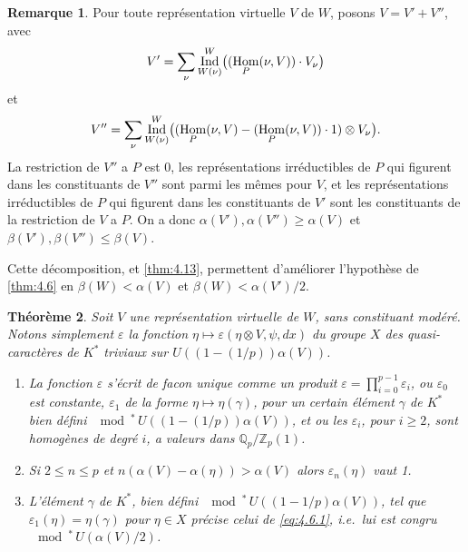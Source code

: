 \documentclass[12pt,a4paper]{article}
\theoremstyle{plain}
\newtheorem{theorem}{Th\'eor\`eme}[section]
\theoremstyle{definition}
\newtheorem{remark}[theorem]{Remarque}
\theoremstyle{remark}
\DeclareMathOperator{\Ind}{Ind}
\DeclareMathOperator{\Hom}{Hom}
\newcommand{\bQ}{\mathbb{Q}}
\newcommand{\bZ}{\mathbb{Z}}
\let\dim\relax\let\det\relax
\providecommand{\Hom}{\operatorname{Hom}}
\begin{document}
\begin{remark}\label{rem:4.14}
Pour toute repr\'esentation virtuelle $V$ de $W$, posons $V = V' + V''$, avec
\[
V' = \sum_\nu \Ind_{W(\nu)}^W\bigl((\dim \Hom_P(\nu, V)) \cdot V_\nu\bigr)
\]
et
\[
V'' = \sum_\nu \Ind_{W(\nu)}^W\bigl((\Hom_P(\nu, V) - (\dim \Hom_P(\nu, V)) \cdot 1) \otimes V_\nu\bigr).
\]
La restriction de $V''$ a $P$ est 0, les repr\'esentations irr\'eductibles de $P$ qui figurent dans les constituants de $V''$ sont parmi les m\^emes pour $V$, et les repr\'esentations irr\'eductibles de $P$ qui figurent dans les constituants de $V'$ sont les constituants de la restriction de $V$ a $P$. On a donc $\alpha(V'), \alpha(V'') \geq \alpha(V)$ et $\beta(V'), \beta(V'') \leq \beta(V)$.

Cette d\'ecomposition, et \ref{thm:4.13}, permettent d'am\'eliorer l'hypoth\`ese de \ref{thm:4.6} en $\beta(W) < \alpha(V)$ et $\beta(W) < \alpha(V')/2$.
\end{remark}

\begin{theorem}\label{thm:4.15}
Soit $V$ une repr\'esentation virtuelle de $W$, sans constituant mod\'er\'e. Notons simplement $\varepsilon$ la fonction $\eta \mapsto \varepsilon(\eta \otimes V, \psi, dx)$ du groupe $X$ des quasi-caract\`eres de $K^*$ triviaux sur $U((1-(1/p))\alpha(V))$.
\begin{enumerate}[label=(\roman*)]
\item La fonction $\varepsilon$ s'\'ecrit de facon unique comme un produit $\varepsilon = \prod_{i=0}^{p-1} \varepsilon_i$, ou $\varepsilon_0$ est constante, $\varepsilon_1$ de la forme $\eta \mapsto \eta(\gamma)$, pour un certain \'el\'ement $\gamma$ de $K^*$ bien d\'efini $\mod^*\, U((1-(1/p))\alpha(V))$, et ou les $\varepsilon_i$, pour $i \geq 2$, sont homog\`enes de degr\'e $i$, a valeurs dans $\bQ_p/\bZ_p(1)$.
\item Si $2 \leq n \leq p$ et $n(\alpha(V) - \alpha(\eta)) > \alpha(V)$ alors $\varepsilon_n(\eta)$ vaut 1.
\item L'\'el\'ement $\gamma$ de $K^*$, bien d\'efini $\mod^*\, U((1-1/p)\alpha(V))$, tel que $\varepsilon_1(\eta) = \eta(\gamma)$ pour $\eta \in X$ pr\'ecise celui de \eqref{eq:4.6.1}, i.e.~lui est congru $\mod^*\, U(\alpha(V)/2)$.
\end{enumerate}
\end{theorem}
\end{document}
